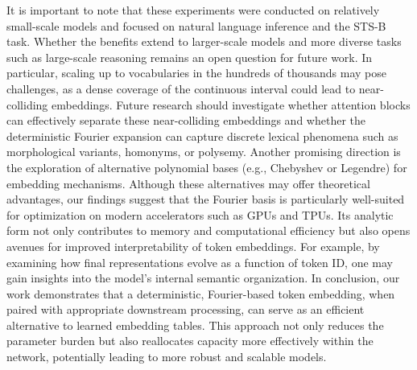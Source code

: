 \documentclass{article}
\begin{document}
It is important to note that these experiments were conducted on relatively small-scale models and focused on natural language inference and the STS-B task. Whether the benefits extend to larger-scale models and more diverse tasks such as large-scale reasoning remains an open question for future work. In particular, scaling up to vocabularies in the hundreds of thousands may pose challenges, as a dense coverage of the continuous interval could lead to near-colliding embeddings. Future research should investigate whether attention blocks can effectively separate these near-colliding embeddings and whether the deterministic Fourier expansion can capture discrete lexical phenomena such as morphological variants, homonyms, or polysemy. Another promising direction is the exploration of alternative polynomial bases (e.g., Chebyshev or Legendre) for embedding mechanisms. Although these alternatives may offer theoretical advantages, our findings suggest that the Fourier basis is particularly well-suited for optimization on modern accelerators such as GPUs and TPUs. Its analytic form not only contributes to memory and computational efficiency but also opens avenues for improved interpretability of token embeddings. For example, by examining how final representations evolve as a function of token ID, one may gain insights into the model's internal semantic organization.
In conclusion, our work demonstrates that a deterministic, Fourier-based token embedding, when paired with appropriate downstream processing, can serve as an efficient alternative to learned embedding tables. This approach not only reduces the parameter burden but also reallocates capacity more effectively within the network, potentially leading to more robust and scalable models.

\end{document}
